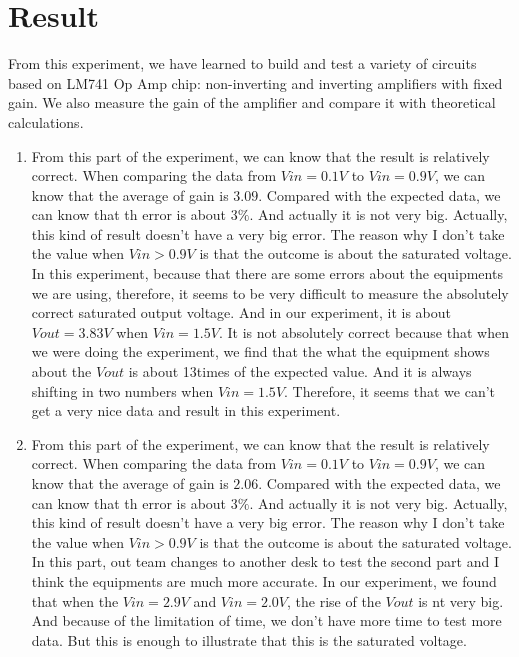 \documentclass{article}
\begin{document}
\section{Result}
From this experiment, we have learned to build and test a variety of circuits based on LM741 Op Amp chip: non-inverting and inverting amplifiers with fixed gain.  We also measure the gain of the amplifier and compare it with theoretical calculations.
\begin{enumerate}
\item From this part of the experiment, we can know that the result is relatively correct. When comparing the data from $Vin=0.1V$ to $Vin=0.9V$, we can know that the average of gain is $3.09$. Compared with the expected data, we can know that th error is about $3\%$. And actually it is not very big. Actually, this kind of result doesn't have a very big error. The reason why I don't take the value when $Vin>0.9V$ is that the outcome is about the saturated voltage. In this experiment, because that there are some errors about the equipments we are using, therefore, it seems to be very difficult to measure the absolutely correct saturated output voltage. And in our experiment, it is about $Vout=3.83V$ when $Vin=1.5V$. It is not absolutely correct because that when we were doing the experiment, we find that the what the equipment shows about the $Vout$ is about 13times of the expected value. And it is always shifting in two numbers when $Vin=1.5V$. Therefore, it seems that we can't get a very nice data and result in this experiment.

\item From this part of the experiment, we can know that the result is relatively correct. When comparing the data from $Vin=0.1V$ to $Vin=0.9V$, we can know that the average of gain is $2.06$. Compared with the expected data, we can know that th error is about $3\%$. And actually it is not very big. Actually, this kind of result doesn't have a very big error.  The reason why I don't take the value when $Vin>0.9V$ is that the outcome is about the saturated voltage. In this part, out team changes to another desk to test the second part and I think the equipments are much more accurate. In our experiment, we found that when the $Vin=2.9V$ and $Vin=2.0V$, the rise of the $Vout$ is nt very big. And because of the limitation of time, we don't have more time to test more data. But this is enough to illustrate that this is the saturated voltage.
\end{enumerate}
\end{document}

